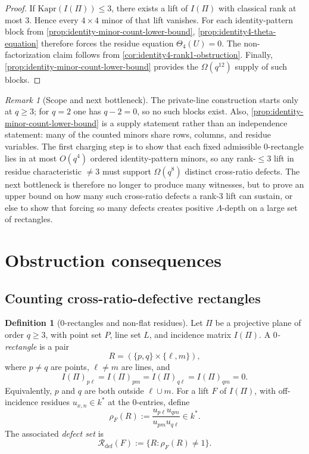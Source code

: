 \documentclass[11pt]{amsart}
\numberwithin{equation}{section}
\theoremstyle{plain}
\theoremstyle{definition}
\newtheorem{definition}[theorem]{Definition}
\theoremstyle{remark}
\newtheorem{remark}[theorem]{Remark}
\newcommand{\Kapr}{\mathrm{Kapr}}
\newcommand{\Lam}{\Lambda}
\begin{document}
\begin{proof}
If $\Kapr(I(\Pi))\le 3$, there exists a lift of $I(\Pi)$ with classical rank at most $3$.
Hence every $4\times4$ minor of that lift vanishes.
For each identity-pattern block from \cref{prop:identity-minor-count-lower-bound}, \cref{prop:identity4-theta-equation} therefore forces the residue equation $\Theta_4(U)=0$.
The non-factorization claim follows from \cref{cor:identity4-rank1-obstruction}.
Finally, \cref{prop:identity-minor-count-lower-bound} provides the $\Omega(q^{12})$ supply of such blocks.
\end{proof}

\begin{remark}[Scope and next bottleneck]
\label{rem:identity-minors-scope-bottleneck}
The private-line construction starts only at $q\ge 3$; for $q=2$ one has $q-2=0$, so no such blocks exist.
Also, \cref{prop:identity-minor-count-lower-bound} is a supply statement rather than an independence statement: many of the counted minors share rows, columns, and residue variables.
The first charging step is to show that each fixed admissible $0$-rectangle lies in at most $O(q^4)$ ordered identity-pattern minors, so any rank-$\le 3$ lift in residue characteristic $\neq 3$ must support $\Omega(q^8)$ distinct cross-ratio defects.
The next bottleneck is therefore no longer to produce many witnesses, but to prove an upper bound on how many such cross-ratio defects a rank-$3$ lift can sustain, or else to show that forcing so many defects creates positive $\Lam$-depth on a large set of rectangles.
\end{remark}



\section{Obstruction consequences}
\label{sec:main}

\subsection{Counting cross-ratio-defective rectangles}

\begin{definition}[$0$-rectangles and non-flat residues]
\label{def:identity-zerorectangle-curvature-set}
Let $\Pi$ be a projective plane of order $q\ge 3$, with point set $P$, line set $L$, and incidence matrix $I(\Pi)$.
A \emph{$0$-rectangle} is a pair
\[
R=(\{p,q\}\times \{\ell,m\}),
\]
where $p\neq q$ are points, $\ell\neq m$ are lines, and
\[
I(\Pi)_{p\ell}=I(\Pi)_{pm}=I(\Pi)_{q\ell}=I(\Pi)_{qm}=0.
\]
Equivalently, $p$ and $q$ are both outside $\ell\cup m$.
For a lift $F$ of $I(\Pi)$, with off-incidence residues $u_{x,n}\in k^*$ at the $0$-entries, define
\[
\rho_F(R):=\frac{u_{p\ell}u_{qm}}{u_{pm}u_{q\ell}}\in k^*.
\]
The associated \emph{defect set} is
\[
\mathcal R_{\mathrm{def}}(F):=\{R:\rho_F(R)\neq 1\}.
\]
\end{definition}
\end{document}
